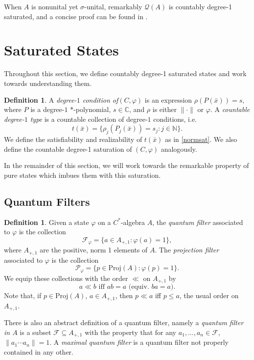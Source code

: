 \documentclass[10pt]{amsart}
\theoremstyle{definition}
\newtheorem{defn}[thm]{Definition}
\newcommand{\Proj}{\mathrm{Proj}}
\newcommand{\Fp}{\mathscr{F}_\varphi}
\newcommand{\Pp}{\mathscr{P}_\varphi}
\begin{document}
When $A$ is nonunital yet $\sigma$-unital, remarkably $\mathscr{Q}(A)$ is countably degree-1 saturated, and a concise proof can be found in \cite[15.1.5]{FA19}.

\section{Saturated States}

Throughout this section, we define countably degree-1 saturated states and work towards understanding them.

\begin{defn}\label{deg1}
    A \textit{degree-$1$ condition of}$(C,\varphi)$ is an expression $\rho(P(\bar{x}))=s$, where $P$ is a degree-$1$ $*$-polynomial, $s\in\mathbb{C}$, and $\rho $ is either $\|\cdot\|$ or $\varphi$. A \textit{countable degree-$1$ type} is a countable collection of degree-$1$ conditions, i.e.
    \[
t(\bar{x})=\{\rho_j(P_j(\bar{x}))=s_j:j\in\mathbb{N}\}.\]
    We define the satisfiability and realizability of $t(\bar{x})$ as in \ref{normsat}. We also define the countable degree-1 saturation of $(C,\varphi)$ analogously.
\end{defn}

In the remainder of this section, we will work towards the remarkable property of pure states which imbues them with this saturation.

\subsection{Quantum Filters}

\begin{defn}\label{filt}
    Given a state $\varphi$ on a $C^*$-algebra $A$, the \textit{quantum filter} associated to $\varphi$ is the collection
    \[\Fp=\{a\in A_{+,1}:\varphi(a)=1\},\]
    where $A_{+,1}$ are the positive, norm 1 elements of $A$.
    The \textit{projection filter} associated to $\varphi$ is the collection
    \[\Pp=\{p\in \Proj(A):\varphi(p)=1\}.\]
    We equip these collections with the order $\ll$ on $A_{+,1}$ by
    \[a\ll b\text{ iff }ab=a \text{ (equiv. }ba=a).\]
    Note that, if $p\in\Proj(A)$, $a\in A_{+,1}$, then $p\ll a$ iff $p\leq a$, the usual order on $A_{+,1}$.

    There is also an abstract definition of a quantum filter, namely a \textit{quantum filter in $A$} is a subset $\mathscr{F}\subseteq A_{+,1}$ with the property that for any $a_1,\dots,a_n\in\mathscr{F}$, $\|a_1\cdots a_n\|=1$. A \textit{maximal quantum filter} is a quantum filter not properly contained in any other.

\end{defn}
\end{document}
